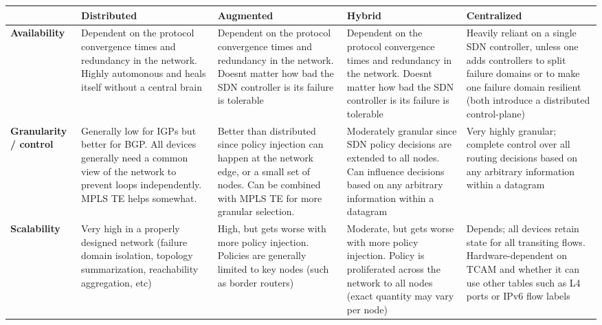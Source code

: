 \begin{longtable}{LLLLL}
\toprule
&
\textbf{Distributed}
&
\textbf{Augmented}
&
\textbf{Hybrid}
&
\textbf{Centralized}
\\ \midrule
\textbf{Availability}
&
Dependent on the protocol convergence times and redundancy in the network.
Highly automonous and heals itself without a central brain
&
Dependent on the protocol convergence times and redundancy in the network.
Doesnt matter how bad the SDN controller is its failure is tolerable
&
Dependent on the protocol convergence times and redundancy in the network.
Doesnt matter how bad the SDN controller is  its failure is tolerable
&
Heavily reliant on a single SDN controller, unless one adds controllers to
split failure domains or to make one failure domain resilient
(both introduce a distributed control-plane)
\\ \midrule
\textbf{Granularity / control}
&
Generally low for IGPs but better for BGP\@. All devices generally need a common
view of the network to prevent loops independently. MPLS TE helps somewhat.
&
Better than distributed since policy injection can happen at the network edge,
or a small set of nodes. Can be combined with MPLS TE for more granular selection.
&
Moderately granular since SDN policy decisions are extended to all nodes. Can
influence decisions based on any arbitrary information within a datagram
&
Very highly granular; complete control over all routing decisions based on any
arbitrary information within a datagram
\\ \midrule
\textbf{Scalability}
&
Very high in a properly designed network (failure domain isolation, topology
summarization, reachability aggregation, etc)
&
High, but gets worse with more policy injection. Policies are generally
limited to key nodes (such as border routers)
&
Moderate, but gets worse with more policy injection. Policy is proliferated
across the network to all nodes (exact quantity may vary per node)
&
Depends; all devices retain state for all transiting flows. Hardware-dependent
on TCAM and whether it can use other tables such as L4 ports or IPv6 flow
labels
\\
\bottomrule
\end{longtable}
